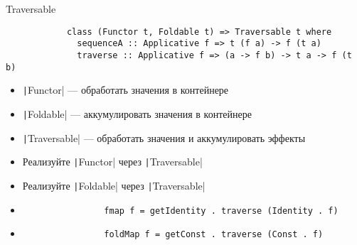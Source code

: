     \begin{frame}[fragile]{Traversable}
        \begin{verbatim}
            class (Functor t, Foldable t) => Traversable t where
              sequenceA :: Applicative f => t (f a) -> f (t a)
              traverse :: Applicative f => (a -> f b) -> t a -> f (t b)
        \end{verbatim}
        \begin{itemize}
            \item \texttt|Functor| --- обработать значения в контейнере
            \item \texttt|Foldable| --- аккумулировать значения в контейнере
            \item \texttt|Traversable| --- обработать значения и аккумулировать эффекты
            \item[\todo] Реализуйте \texttt|Functor| через \texttt|Traversable|
            \item[\todo] Реализуйте \texttt|Foldable| через \texttt|Traversable|
            \item[\answer] \pause
            \begin{verbatim}
                fmap f = getIdentity . traverse (Identity . f)
            \end{verbatim}
            \item[\answer] \pause
            \begin{verbatim}
                foldMap f = getConst . traverse (Const . f)
            \end{verbatim}
        \end{itemize}
    \end{frame}

